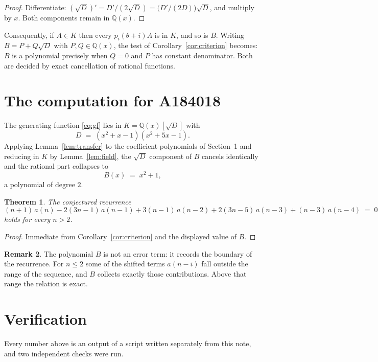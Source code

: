 \documentclass[11pt,a4paper]{article}
\theoremstyle{plain}
\newtheorem{theorem}{Theorem}
\theoremstyle{definition}
\newtheorem{remark}[theorem]{Remark}
\begin{document}
\begin{proof}
Differentiate: $(\sqrt{D})'=D'/(2\sqrt{D})=\bigl(D'/(2D)\bigr)\sqrt{D}$, and multiply by
$x$. Both components remain in $\mathbb{Q}(x)$.
\end{proof}

Consequently, if $A\in K$ then every $p_{i}(\theta+i)A$ is in $K$, and so is $B$. Writing
$B=P+Q\sqrt{D}$ with $P,Q\in\mathbb{Q}(x)$, the test of Corollary~\ref{cor:criterion}
becomes: $B$ is a polynomial precisely when $Q=0$ and $P$ has constant denominator. Both
are decided by exact cancellation of rational functions.

\section{The computation for A184018}

The generating function \eqref{eq:gf} lies in $K=\mathbb{Q}(x)[\sqrt{D}]$ with
\[
D \;=\; \left(x^{2} + x - 1\right) \left(x^{2} + 5 x - 1\right) .
\]
Applying Lemma~\ref{lem:transfer} to the coefficient polynomials of Section~1 and reducing
in $K$ by Lemma~\ref{lem:field}, the $\sqrt{D}$ component of $B$ cancels identically and
the rational part collapses to
\[
B(x)\;=\;x^{2} + 1 ,
\]
a polynomial of degree $2$.

\begin{theorem}
The conjectured recurrence
\[
(n + 1)\,a(n) -  2 \left(3 n - 1\right)\,a(n-1) + 3 \left(n - 1\right)\,a(n-2) + 2 \left(3 n - 5\right)\,a(n-3) + (n - 3)\,a(n-4) \;=\;0
\]
holds for every $n>2$.
\end{theorem}

\begin{proof}
Immediate from Corollary~\ref{cor:criterion} and the displayed value of $B$.
\end{proof}

\begin{remark}
The polynomial $B$ is not an error term: it records the boundary of the recurrence. For
$n\le2$ some of the shifted terms $a(n-i)$ fall outside the range of the sequence,
and $B$ collects exactly those contributions. Above that range the relation is exact.
\end{remark}

\section{Verification}

Every number above is an output of a script written separately from this note, and two
independent checks were run.
\end{document}

